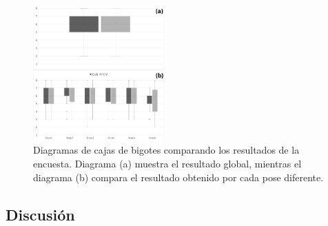 %

\begin{figure}[h]%
   \centering
   \includegraphics[width=0.45\textwidth]{IMG/boxplot}
    \caption{ Diagramas de cajas de bigotes comparando los resultados de la encuesta. Diagrama (a) muestra el resultado global, mientras el diagrama (b) compara el resultado obtenido por cada pose diferente.}
\label{fig:stat}
   \end{figure}



%















\subsection{Discusión}
\label{posing:discusion}


